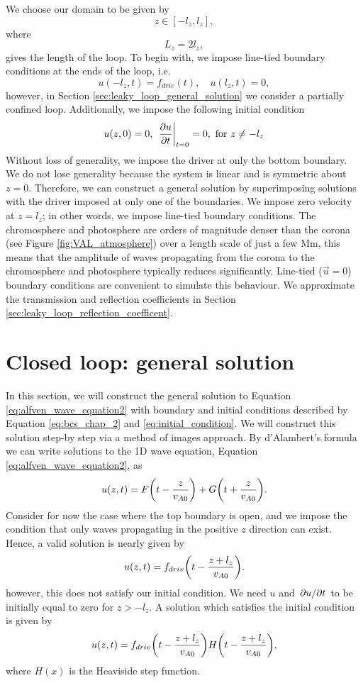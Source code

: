We choose our domain to be given by
\[z\in[-l_z,l_z],\]
where
\[L_z=2l_z,\]
gives the length of the loop. To begin with, we impose line-tied boundary conditions at the ends of the loop, i.e.
\begin{equation}
    \label{eq:bcs_chap_2}
    u(-l_z,t) = f_{driv}(t),\quad u(l_z,t)=0,
\end{equation}
however, in Section \ref{sec:leaky_loop_general_solution} we consider a partially confined loop. Additionally, we impose the following initial condition
\begin{equation}
    \label{eq:initial_condition}
    u(z,0) = 0,\ \left.\pdv{u}{t}\right|_{t=0} = 0,\ \text{for}\ z\ne-l_z
\end{equation}
Without loss of generality, we impose the driver at only the bottom boundary. We do not lose generality because the system is linear and is symmetric about $z=0$. Therefore, we can construct a general solution by superimposing solutions with the driver imposed at only one of the boundaries. We impose zero velocity at $z=l_z$; in other words, we impose line-tied boundary conditions. The chromosphere and photosphere are orders of magnitude denser than the corona (see Figure \ref{fig:VAL_atmosphere}) over a length scale of just a few Mm, this means that the amplitude of waves propagating from the corona to the chromosphere and photosphere typically reduces significantly. Line-tied ($\vec{u}=0$) boundary conditions are convenient to simulate this behaviour. We approximate the transmission and reflection coefficients in Section \ref{sec:leaky_loop_reflection_coefficent}.

\section{Closed loop: general solution}
\label{sec:chap_2_closed_loop_general_soln}

In this section, we will construct the general solution to Equation \eqref{eq:alfven_wave_equation2} with boundary and initial conditions described by Equation \eqref{eq:bcs_chap_2} and \eqref{eq:initial_condition}. We will construct this solution step-by step via a method of images approach. By d'Alambert's formula we can write solutions to the 1D wave equation, Equation \eqref{eq:alfven_wave_equation2}, as
\begin{equation}
    u(z,t) = F\qty(t - \frac{z}{v_{A0}}) + G\qty(t + \frac{z}{v_{A0}}).
\end{equation}
Consider for now the case where the top boundary is open, and we impose the condition that only waves propagating in the positive $z$ direction can exist. Hence, a valid solution is nearly given by
\[u(z,t) = f_{driv}\qty(t - \frac{z+l_z}{v_{A0}}).\]
however, this does not satisfy our initial condition. We need $u$ and $\pdv*{u}{t}$ to be initially equal to zero for $z>-l_z$. A solution which satisfies the initial condition is given by
\[u(z,t) = f_{driv}\qty(t - \frac{z+l_z}{v_{A0}})H\qty(t - \frac{z+l_z}{v_{A0}}),\]
where $H(x)$ is the Heaviside step function.

